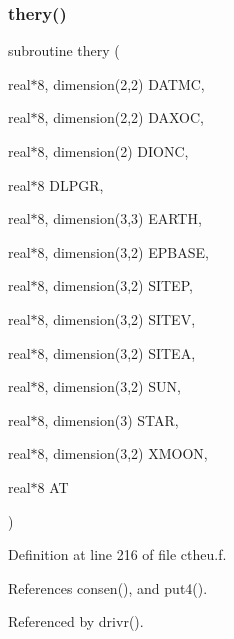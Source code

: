 \subsubsection{\texorpdfstring{thery()}{thery()}}
{\footnotesize\ttfamily subroutine thery (\begin{DoxyParamCaption}\item[{real$\ast$8, dimension(2,2)}]{D\+A\+T\+MC,  }\item[{real$\ast$8, dimension(2,2)}]{D\+A\+X\+OC,  }\item[{real$\ast$8, dimension(2)}]{D\+I\+O\+NC,  }\item[{real$\ast$8}]{D\+L\+P\+GR,  }\item[{real$\ast$8, dimension(3,3)}]{E\+A\+R\+TH,  }\item[{real$\ast$8, dimension(3,2)}]{E\+P\+B\+A\+SE,  }\item[{real$\ast$8, dimension(3,2)}]{S\+I\+T\+EP,  }\item[{real$\ast$8, dimension(3,2)}]{S\+I\+T\+EV,  }\item[{real$\ast$8, dimension(3,2)}]{S\+I\+T\+EA,  }\item[{real$\ast$8, dimension(3,2)}]{S\+UN,  }\item[{real$\ast$8, dimension(3)}]{S\+T\+AR,  }\item[{real$\ast$8, dimension(3,2)}]{X\+M\+O\+ON,  }\item[{real$\ast$8}]{AT }\end{DoxyParamCaption})}



Definition at line 216 of file ctheu.\+f.



References consen(), and put4().



Referenced by drivr().

